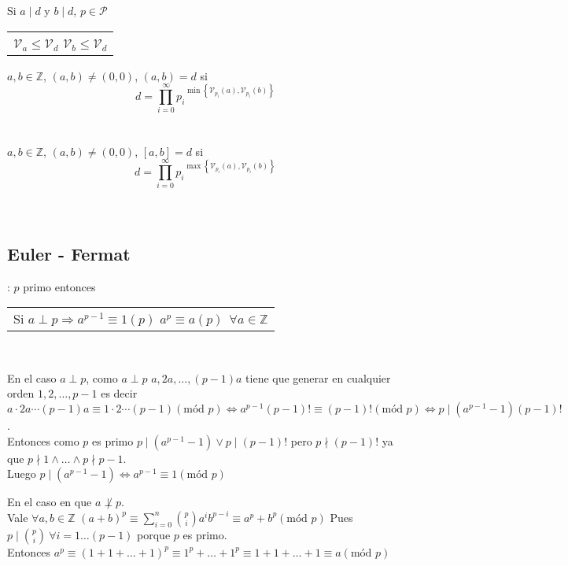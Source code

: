 \documentclass[a4paper,10pt]{article}
\begin{document}
\observacion Si $a \mid d$ y $b \mid d$, $p \in \mathcal{P}$ 
\begin{tabular}{l}
	$\mathcal{V}_{a} \leq \mathcal{V}_{d}$ 
	\cr $\mathcal{V}_{b} \leq \mathcal{V}_{d}$ 
\end{tabular}

 $a,b \in \mathbb{Z}$, $(a,b) \neq (0,0)$, $(a,b) = d$ si 
$$d = \prod_{i=0}^{\infty} {{p_{i}}^{\min \left\lbrace {\mathcal{V}_{p_i}(a)}, {\mathcal{V}_{p_i}(b)} \right\rbrace }}$$ \\ \\

 $a,b \in \mathbb{Z}$, $(a,b) \neq (0,0)$, $[a,b] = d$ si 
$$d = \prod_{i=0}^{\infty} {{p_{i}}^{\max \left\lbrace {\mathcal{V}_{p_i}(a)}, {\mathcal{V}_{p_i}(b)} \right\rbrace }}$$ \\ \\

\subsection{Euler - Fermat}

 
: $p$ primo entonces
\begin{tabular}{l}
	Si $a \perp p \Rightarrow a^{p-1} \equiv 1 (p)$
	\cr $a^{p} \equiv a (p) \ \ \forall a \in \mathbb{Z}$
\end{tabular}
\\
\ifversionlarga
\begin{demo}
	En el caso $a \perp p$, como $a \perp p$ $a,2a,\dots,(p-1)a$ tiene que generar en cualquier orden $1,2,\dots,p-1$ es decir \\
	$a \cdot 2a \cdots (p-1)a \equiv 1 \cdot 2 \cdots (p-1) (\mbox{mód } p) \Leftrightarrow a^{p-1}  {(p-1)!} \equiv (p-1)! (\mbox{mód } p) \Leftrightarrow p \mid {(a^{p-1}-1)(p-1)!}$. \\ Entonces como $p$ es primo $p \mid {(a^{p-1}-1)} \vee p \mid {(p-1)!}$ pero $p \nmid {(p-1)!}$ ya que $p \nmid 1 \wedge \dots \wedge p \nmid p-1$. \\Luego $p \mid {(a^{p-1}-1)} \Leftrightarrow a^{p-1} \equiv 1 (\mbox{mód } p)$
	\par\indent En el caso en que $a \not\perp p$. \\
	Vale $\forall a,b \in \mathbb{Z}$ $(a+b)^{p} \equiv \sum_{i = 0}^{n} {\binom{p}{i} {a}^{i} {b}^{p-i}} \equiv a^{p}+b^{p} (\mbox{mód } p)$ Pues $p \mid \binom{p}{i} \  \forall i=1 \dots (p-1)$ porque $p$ es primo. \\
	Entonces $a^{p} \equiv (1+1+\dots+1)^{p} \equiv 1^{p}+\dots+1^{p} \equiv 1+1+\dots+1 \equiv a (\mbox{mód } p)$
\end{demo}
\else
\fi 
\hspace*{\fill} \\
\end{document}
